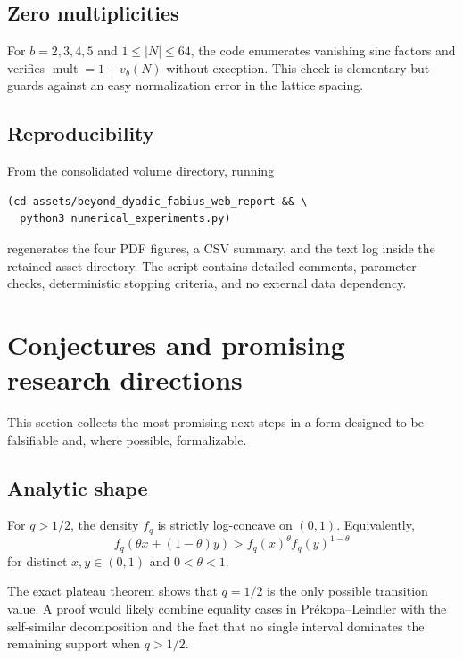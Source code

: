 \documentclass[11pt]{article}
\numberwithin{equation}{section}
\theoremstyle{definition}
\theoremstyle{remark}
\begin{document}
\subsection{Zero multiplicities}

For $b=2,3,4,5$ and $1\le|N|\le64$, the code enumerates vanishing sinc factors and verifies
\(
 \operatorname{mult}=1+v_b(N)
\)
without exception.  This check is elementary but guards against an easy normalization error
in the lattice spacing.

\subsection{Reproducibility}

From the consolidated volume directory, running
\begin{lstlisting}[style=code]
(cd assets/beyond_dyadic_fabius_web_report && \
  python3 numerical_experiments.py)
\end{lstlisting}
regenerates the four PDF figures, a CSV summary, and the text log inside the retained asset
directory.
The script contains detailed comments, parameter checks, deterministic stopping criteria, and
no external data dependency.

\section{Conjectures and promising research directions}
\label{p10:sec:future}

This section collects the most promising next steps in a form designed to be falsifiable and,
where possible, formalizable.

\subsection{Analytic shape}

\begin{conjecture}
For $q>1/2$, the density $f_q$ is strictly log-concave on $(0,1)$.  Equivalently,
\[
 f_q(\theta x+(1-\theta)y)
 >f_q(x)^\theta f_q(y)^{1-\theta}
\]
for distinct $x,y\in(0,1)$ and $0<\theta<1$.
\end{conjecture}

The exact plateau theorem shows that $q=1/2$ is the only possible transition value.  A proof
would likely combine equality cases in Pr\'ekopa--Leindler with the self-similar decomposition
and the fact that no single interval dominates the remaining support when $q>1/2$.
\end{document}
